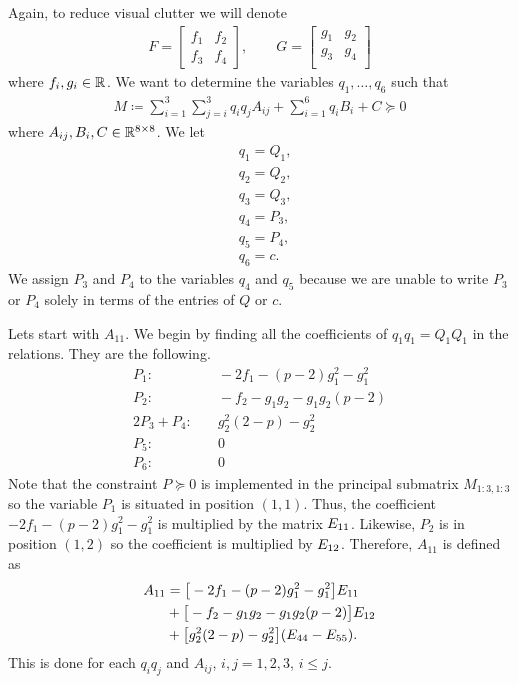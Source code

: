 \documentclass[a4paper,12pt,twoside,BCOR=10mm]{scrbook}
\begin{document}
Again, to reduce visual clutter we will denote
\begin{align*}
    F = \begin{bmatrix}
    f_1 & f_2\\
    f_3 & f_4
    \end{bmatrix}
    , \qquad
    G = \begin{bmatrix}
    g_1 & g_2\\
    g_3 & g_4\\
    \end{bmatrix}
\end{align*}
where $f_i,g_i \in \mathbb{R}^{}$. We want to determine the variables $q_1, \ldots, q_6$ such that
\begin{align*}
    M \coloneqq \sum_{i = 1}^3\sum_{j = i}^3 q_i q_j A_{ij} + \sum_{i = 1}^6 q_i B_i + C \succeq 0
\end{align*}
where $A_{ij}, B_i, C \in \mathbb{R}^{8\times 8}$. We let
\begin{align*}
    &q_1 = Q_1,\\
    &q_2 = Q_2,\\
    &q_3 = Q_3,\\
    &q_4 = P_3,\\
    &q_5 = P_4,\\
    &q_6 = c.
\end{align*}
We assign $P_3$ and $P_4$ to the variables $q_4$ and $q_5$ because we are unable to write $P_3$ or $P_4$ solely in terms of the entries of $Q$ or $c$.

Lets start with $A_{11}$. We begin by finding all the coefficients of $q_1q_1 = Q_1Q_1$ in the relations. They are the following.
\begin{align*}
    P_1:& \quad -2f_1 - (p - 2)g_1^2 - g_1^2\\
    P_2:& \quad -f_2 - g_1g_2 - g_1g_2(p - 2)\\
    2P_3 + P_4:& \quad g_2^2(2 - p) - g_2^2\\
    P_5:& \quad 0\\
    P_6:& \quad 0
\end{align*}
Note that the constraint $P \succeq 0$ is implemented in the principal submatrix $M_{1:3,1:3}$ so the variable $P_1$ is situated in position $(1,1)$. Thus, the coefficient $-2f_1 - (p - 2)g_1^2 - g_1^2$ is multiplied by the matrix $E_{11}$. Likewise, $P_2$ is in position $(1,2)$ so the coefficient is multiplied by $E_{12}$. Therefore, $A_{11}$ is defined as
\begin{align*}
    A_{11} &= \big[-2f_1 - (p - 2)g_1^2 - g_1^2\big]E_{11}\\
    \quad& + \big[-f_2 - g_1g_2 - g_1g_2(p - 2)\big]E_{12}\\
    \quad& + \big[g_2^2(2 - p) - g_2^2\big](E_{44} - E_{55}).
\end{align*}
This is done for each $q_iq_j$ and $A_{ij}$, $i,j = 1,2,3$, $i \leq j$.
\end{document}
